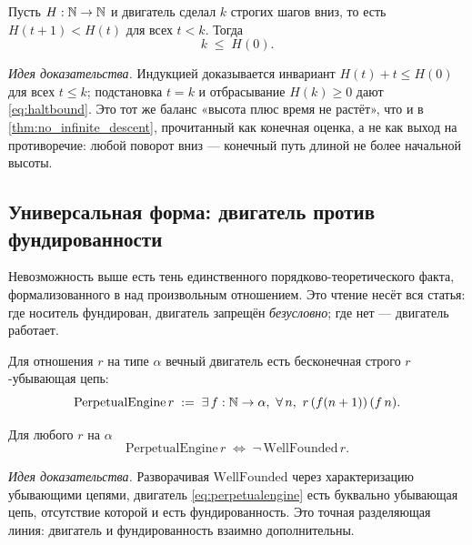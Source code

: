 \begin{theorem}\label{thm:turned_engine_halts}
\green{}\; Пусть $H:\mathbb{N}\to\mathbb{N}$ и двигатель сделал $k$ строгих шагов вниз, то есть $H(t+1)<H(t)$ для всех
$t<k$. Тогда
\begin{equation}\label{eq:haltbound}
  k \;\le\; H(0).
\end{equation}
\end{theorem}

\emph{Идея доказательства.} Индукцией доказывается инвариант $H(t)+t\le H(0)$ для всех $t\le k$;
подстановка $t=k$ и отбрасывание $H(k)\ge 0$ дают \cref{eq:haltbound}. Это тот же баланс «высота плюс
время не растёт», что и в \cref{thm:no_infinite_descent}, прочитанный как конечная оценка, а не как
выход на противоречие: любой поворот вниз --- конечный путь длиной не более начальной высоты.

\subsection{Универсальная форма: двигатель против фундированности}

Невозможность выше есть тень единственного порядково-теоретического факта, формализованного в
 над произвольным отношением. Это чтение несёт вся статья: где носитель
фундирован, двигатель запрещён \emph{безусловно}; где нет --- двигатель работает.

\begin{definition}\label{thm:PerpetualEngine}
Для отношения $r$ на типе $\alpha$ вечный двигатель есть бесконечная строго $r$-убывающая цепь:
\begin{equation}\label{eq:perpetualengine}
  \mathrm{PerpetualEngine}\,r \;:=\; \exists\, f:\mathbb{N}\to\alpha,\ \forall\, n,\ r\,(f(n+1))\,(f\,n).
\end{equation}
\end{definition}

\begin{theorem}\label{thm:perpetualEngine_iff_not_wellFounded}
\green{}\; Для любого $r$ на $\alpha$
\begin{equation}\label{eq:dividingline}
  \mathrm{PerpetualEngine}\,r \;\Longleftrightarrow\; \neg\,\mathrm{WellFounded}\,r.
\end{equation}
\end{theorem}

\emph{Идея доказательства.} Разворачивая $\mathrm{WellFounded}$ через характеризацию убывающими цепями,
двигатель \cref{eq:perpetualengine} есть буквально убывающая цепь, отсутствие которой и есть
фундированность. Это точная разделяющая линия: двигатель и фундированность взаимно дополнительны.

